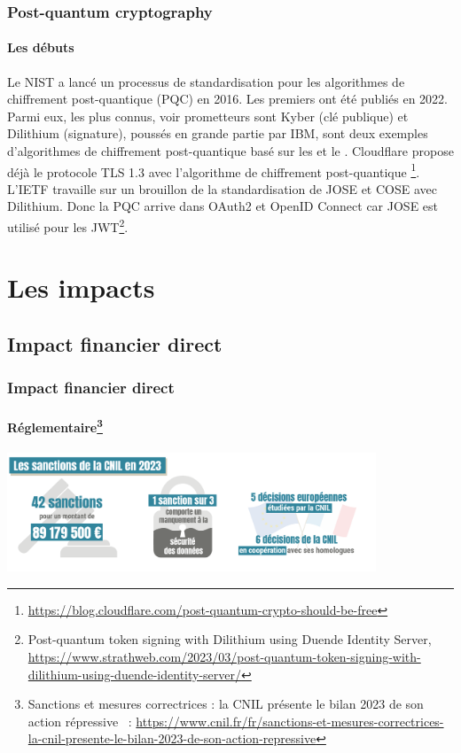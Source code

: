 \documentclass{beamer}
\begin{document}
    \begin{frame}
        \frametitle{Post-quantum cryptography}
        \framesubtitle{Les débuts}
        \begin{footnotesize}
            \transdissolve
            Le NIST a lancé un processus de standardisation pour les algorithmes de chiffrement post-quantique (PQC) en 2016.
            Les premiers ont été publiés en 2022.
            Parmi eux, les plus connus, voir prometteurs sont Kyber (clé publique) et Dilithium (signature), poussés en grande partie par IBM, sont deux exemples d'algorithmes de chiffrement post-quantique basé sur les  et le .
            \bigbreak
            Cloudflare propose déjà le protocole TLS 1.3 avec l'algorithme de chiffrement post-quantique \footnote{\url{https://blog.cloudflare.com/post-quantum-crypto-should-be-free}}.
            \bigbreak
            L'IETF travaille sur un brouillon de la standardisation de JOSE et COSE avec Dilithium.
            Donc la PQC arrive dans OAuth2 et OpenID Connect car JOSE est utilisé pour les JWT\footnote{Post-quantum token signing with Dilithium using Duende Identity Server, \url{https://www.strathweb.com/2023/03/post-quantum-token-signing-with-dilithium-using-duende-identity-server/}}.
        \end{footnotesize}
    \end{frame}


    \section{Les impacts}\label{sec:les-impacts}

    \subsection{Impact financier direct}\label{subsec:impact-financier-direct}
    \begin{frame}
        \frametitle{Impact financier direct}
        \framesubtitle{Réglementaire\footnote{Sanctions et mesures correctrices : la CNIL présente le bilan 2023 de son action répressive ~: \url{https://www.cnil.fr/fr/sanctions-et-mesures-correctrices-la-cnil-presente-le-bilan-2023-de-son-action-repressive}}}
        \transdissolve
        \centering
        \includegraphics[width=11cm]{image/sanctions-cnil-2023}
    \end{frame}
\end{document}
